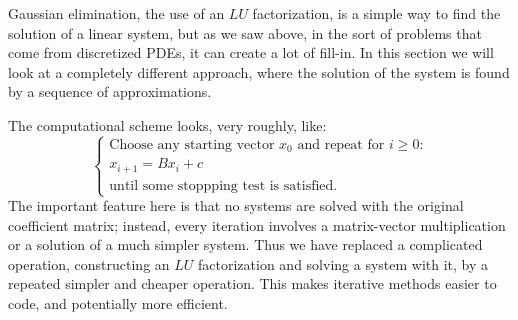 
Gaussian elimination, the use of an $LU$ factorization, is a simple
way to find the solution of a linear system, but as we saw above, in
the sort of problems that come from discretized \ac{PDE}s, it can 
create a lot of fill-in. In this section we will look at a completely
different approach, where the solution of the system is found
by a sequence of approximations.

The computational scheme looks, very roughly, like:
\[
\begin{cases}
  \mbox{Choose any starting vector $x_0$ and repeat for $i\geq0$:}\\
  x_{i+1}=Bx_i+c\\
  \mbox{until some stoppping test is satisfied.}
\end{cases}
\]
The important feature here is that no systems are solved with the
original coefficient matrix; instead,
every iteration involves a matrix-vector multiplication or a solution
of a much simpler system. Thus
we have replaced a complicated operation, constructing an $LU$
factorization and solving a system with it, by a repeated simpler
and cheaper operation. This makes iterative methods easier to code,
and potentially more efficient.

